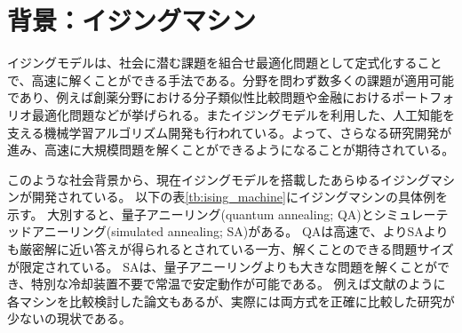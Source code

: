 \documentclass[12pt, dvipdfmx]{jmaster}
\theoremstyle{definition}
\begin{document}
\section{背景：イジングマシン}
イジングモデルは、社会に潜む課題を組合せ最適化問題として定式化することで、高速に解くことができる手法である。分野を問わず数多くの課題が適用可能であり、例えば創薬分野における分子類似性比較問題\cite{souyaku_fujitu}や金融におけるポートフォリオ最適化問題\cite{1qbit_}などが挙げられる。またイジングモデルを利用した、人工知能を支える機械学習アルゴリズム開発も行われている。よって、さらなる研究開発が進み、高速に大規模問題を解くことができるようになることが期待されている。

このような社会背景から、現在イジングモデルを搭載したあらゆるイジングマシンが開発されている。
以下の表\ref{tb:ising_machine}にイジングマシンの具体例を示す\cite{d-wave, maezawa2019toward, digital_annealer, cmos, sbm, tsubasa, hamerly2019experimental}。
大別すると、量子アニーリング(quantum annealing; QA)とシミュレーテッドアニーリング(simulated annealing; SA)がある。
QAは高速で、よりSAよりも厳密解に近い答えが得られるとされている一方、解くことのできる問題サイズが限定されている。
SAは、量子アニーリングよりも大きな問題を解くことができ、特別な冷却装置不要で常温で安定動作が可能である。
例えば文献\cite{hamerly2019experimental}のように各マシンを比較検討した論文もあるが、実際には両方式を正確に比較した研究が少ないの現状である。
\end{document}
